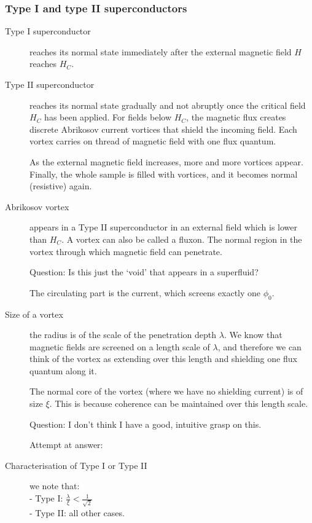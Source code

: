 \subsubsection{Type I and type II superconductors}
\begin{description}
\item[Type I superconductor] reaches its normal state immediately after the external magnetic field $H$ reaches $H_C$. 

\item[Type II superconductor] reaches its normal state gradually and not abruptly once the critical field $H_C$ has been applied. For fields below $H_C$, the magnetic flux creates discrete Abrikosov current vortices that shield the incoming field. Each vortex carries on thread of magnetic field with one flux quantum. 

As the external magnetic field increases, more and more vortices appear. Finally, the whole sample is filled with vortices, and it becomes normal (resistive) again. 

\item[Abrikosov vortex] appears in a Type II superconductor in an external field which is lower than $H_C$. A vortex can also be called a fluxon. The normal region in the vortex through which magnetic field can penetrate. 

Question: Is this just the `void' that appears in a superfluid? 

The circulating part is the current, which screens exactly one $\phi_0$. 

\item[Size of a vortex] the radius is of the scale of the penetration depth $\lambda$. We know that magnetic fields are screened on a length scale of $\lambda$, and therefore we can think of the vortex as extending over this length and shielding one flux quantum along it. 

The normal core of the vortex (where we have no shielding current) is of size $\xi$. This is because coherence can be maintained over this length scale. 

Question: I don't think I have a good, intuitive grasp on this. 

Attempt at answer: 

\item[Characterisation of Type I or Type II] we note that: \\ 
- Type I: $\frac{\lambda}{\xi} < \frac{1}{\sqrt{2}}$ \\
- Type II: all other cases. 

\end{description}
